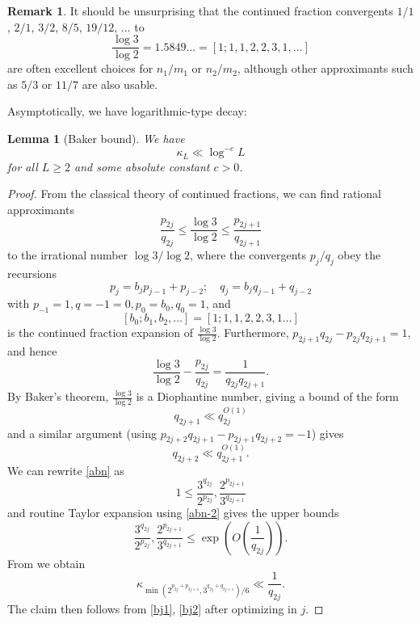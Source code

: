 \documentclass[12pt,a4paper,reqno]{amsart}
\numberwithin{equation}{section}
\theoremstyle{plain}
\newtheorem{lemma}[theorem]{Lemma}
\theoremstyle{definition}
\newtheorem{remark}[theorem]{Remark}
\begin{document}
\begin{remark}
It should be unsurprising that the continued fraction convergents $1/1$, $2/1$, $3/2$, $8/5$, $19/12$, $\dots$ to 
$$\frac{\log 3}{\log 2} = 1.5849\dots = [1; 1,1,2,2,3,1,\dots]$$
are often excellent choices for $n_1/m_1$ or $n_2/m_2$, although other approximants such as $5/3$ or $11/7$ are also usable.
\end{remark}

Asymptotically, we have logarithmic-type decay:

\begin{lemma}[Baker bound]\label{baker} We have
  $$ \kappa_L \ll \log^{-c} L$$
for all $L \geq 2$ and some absolute constant $c>0$.
\end{lemma}


\begin{proof}  From the classical theory of continued fractions, we can find rational approximants
\begin{equation}\label{abn}
 \frac{p_{2j}}{q_{2j}} \leq \frac{\log 3}{\log 2} \leq \frac{p_{2j+1}}{q_{2j+1}}
\end{equation}
to the irrational number $\log 3/\log 2$, where the convergents $p_j/q_j$ obey the recursions
$$ p_j = b_j p_{j-1} + p_{j-2}; \quad q_j = b_j q_{j-1} + q_{j-2}$$
with $p_{-1} = 1, q={-1}=0, p_0 = b_0, q_0=1$, and 
$$[b_0;b_1,b_2,\dots] = [1;1,1,2,2,3,1\dots]$$ 
is the continued fraction expansion of $\frac{\log 3}{\log 2}$.  Furthermore, $p_{2j+1}q_{2j} - p_{2j} q_{2j+1} = 1$, and hence
\begin{equation}\label{abn-2} 
  \frac{\log 3}{\log 2} - \frac{p_{2j}}{q_{2j}} = \frac{1}{q_{2j} q_{2j+1}}.
\end{equation}
By Baker's theorem, $\frac{\log 3}{\log 2}$ is a Diophantine number, giving a bound of the form
\begin{equation}\label{bj1}
   q_{2j+1} \ll q_{2j}^{O(1)}
\end{equation}
and a similar argument (using $p_{2j+2} q_{2j+1}-p_{2j+1} q_{2j+2} = -1$) gives
\begin{equation}\label{bj2}
 q_{2j+2} \ll q_{2j+1}^{O(1)}.
\end{equation}
We can rewrite \eqref{abn} as
$$ 1 \leq \frac{3^{q_{2j}}}{2^{p_{2j}}}, \frac{2^{p_{2j+1}}}{3^{q_{2j+1}}}$$
and routine Taylor expansion using \eqref{abn-2} gives the upper bounds
$$ \frac{3^{q_{2j}}}{2^{p_{2j}}}, \frac{2^{p_{2j+1}}}{3^{q_{2j+1}}}\leq \exp\left( O\left( \frac{1}{q_{2j}}\right)\right).$$
From  we obtain
$$
\kappa_{\min(2^{p_{2j} + p_{2j+1}}, 3^{q_{2j}+q_{2j+1}})/6} \ll \frac{1}{q_{2j}}.$$
The claim then follows from \eqref{bj1}, \eqref{bj2} after optimizing in $j$.

\end{proof}
\end{document}
